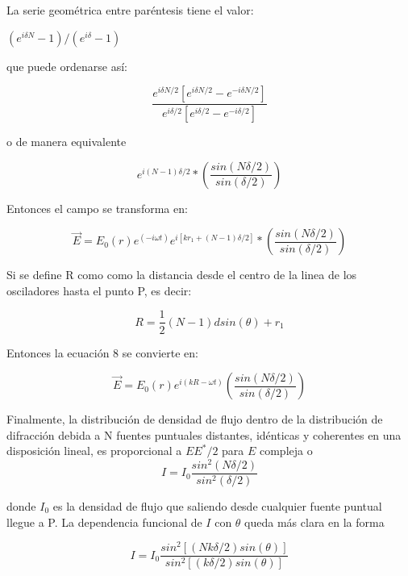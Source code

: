 \documentclass[12]{article}
\begin{document}
\begin{multicols}{2}
La serie geométrica entre paréntesis tiene el valor: 
\begin{center}
$(e^{i\delta N} -1)/(e^{i\delta} -1) $
\end{center}

que puede ordenarse así:

\begin{equation}
\frac{e^{i\delta N/2}[e^{i\delta N/2} - e^{-i\delta N/2}]} {e^{i\delta /2}[e^{i\delta /2} - e^{-i\delta /2}]}
\end{equation}

o de manera equivalente

\begin{equation}
e^{i(N -1)\delta/2} * (\frac{sin(N\delta /2)}{sin(\delta /2)})
\end{equation}

Entonces el campo se transforma en:

\begin{equation}
\vec{E} = E_{0}(r)e^{(-i\omega t)}e^{i[kr_{1} + (N -1)\delta/2]}* (\frac{sin(N\delta /2)}{sin(\delta /2)})
\end{equation}


Si se define R como  como la distancia desde el centro de la linea de los osciladores hasta el punto P, es decir:

\begin{equation}
R = \frac{1}{2}(N-1)d sin(\theta) + r_{1}
\end{equation}

Entonces la ecuación 8 se convierte en:

\begin{equation}
\vec{E} = E_{0}(r)e^{i(kR - \omega t)} (\frac{sin(N\delta /2)}{sin(\delta /2)})
\end{equation}

Finalmente, la distribución de densidad de flujo dentro de la distribución de difracción debida a N fuentes puntuales distantes, idénticas y coherentes en una disposición lineal, es proporcional a $EE^{*}/2$ para $E$ compleja  o
\begin{equation}
I = I_{0}\frac{sin^{2}(N\delta/2)}{sin^{2}(\delta/2)}
\end{equation}

donde $I_{0}$ es la densidad de flujo que saliendo desde cualquier fuente puntual llegue a P. La dependencia funcional de $I$ con $\theta$ queda más clara en la forma 

\begin{equation}
I = I_{0}\frac{sin^{2}[(Nk\delta/2)sin(\theta)]}{sin^{2}[(k\delta/2)sin(\theta)]}
\end{equation}


\end{multicols}
\end{document}
